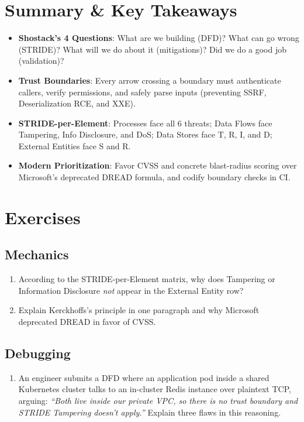 \section{Summary \protect\& Key Takeaways}

\begin{itemize}[leftmargin=18pt]
  \item \textbf{Shostack's 4 Questions}: What are we building (DFD)? What can go wrong (STRIDE)? What will we do about it (mitigations)? Did we do a good job (validation)?
  \item \textbf{Trust Boundaries}: Every arrow crossing a boundary must authenticate callers, verify permissions, and safely parse inputs (preventing SSRF, Deserialization RCE, and XXE).
  \item \textbf{STRIDE-per-Element}: Processes face all 6 threats; Data Flows face Tampering, Info Disclosure, and DoS; Data Stores face T, R, I, and D; External Entities face S and R.
  \item \textbf{Modern Prioritization}: Favor CVSS and concrete blast-radius scoring over Microsoft's deprecated DREAD formula, and codify boundary checks in CI.
\end{itemize}

\section{Exercises}

\subsection*{Mechanics}
\begin{enumerate}[label=\textbf{Exercise~\thechapter.\arabic*}, leftmargin=*]
  \item According to the STRIDE-per-Element matrix, why does Tampering or Information Disclosure \emph{not} appear in the External Entity row?
  \item Explain Kerckhoffs's principle in one paragraph and why Microsoft deprecated DREAD in favor of CVSS.
\end{enumerate}

\subsection*{Debugging}
\begin{enumerate}[label=\textbf{Exercise~\thechapter.\arabic*}, leftmargin=*, start=3]
  \item An engineer submits a DFD where an application pod inside a shared Kubernetes cluster talks to an in-cluster Redis instance over plaintext TCP, arguing: \textit{``Both live inside our private VPC, so there is no trust boundary and STRIDE Tampering doesn't apply.''} Explain three flaws in this reasoning.
\end{enumerate}

